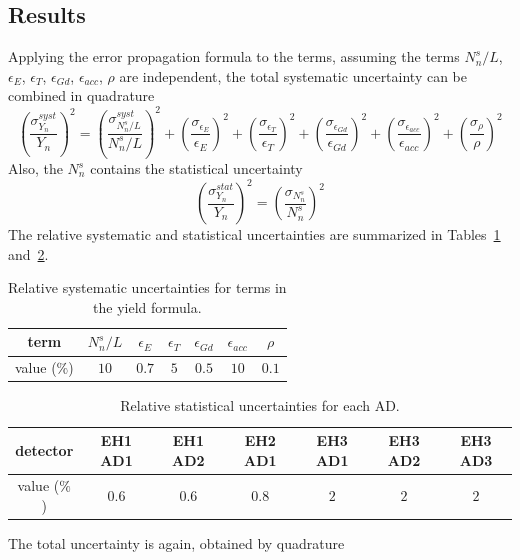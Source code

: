\subsection{Results}
Applying the error propagation formula to the terms, assuming the terms $N_n^s/L$, $\epsilon_E$, $\epsilon_{T}$, $\epsilon_{Gd}$, $\epsilon_{acc}$, $\rho$ are independent, the total systematic uncertainty can be combined in quadrature
\begin{equation}
	\left(\frac{\sigma^{syst}_{Y_n}}{Y_n}\right)^2=\left(\frac{\sigma_{N_n^s/L}^{syst}}{N_n^s/L}\right)^2+\left(\frac{\sigma_{\epsilon_E}}{\epsilon_E}\right)^2+\left(\frac{\sigma_{\epsilon_{T}}}{\epsilon_{T}}\right)^2+\left(\frac{\sigma_{\epsilon_{Gd}}}{\epsilon_{Gd}}\right)^2+\left(\frac{\sigma_{\epsilon_{acc}}}{\epsilon_{acc}}\right)^2+\left(\frac{\sigma_{\rho}}{\rho}\right)^2
\end{equation}
Also, the $N_n^s$ contains the statistical uncertainty
\begin{equation}
	\left(\frac{\sigma^{stat}_{Y_n}}{Y_n}\right)^2=\left(\frac{\sigma_{N_n^s}}{N_n^s}\right)^2
\end{equation}
The relative systematic and statistical uncertainties are summarized in Tables~\ref{tab:systematic_uncertainties} and~\ref{tab:statistical_uncertainties}.
\begin{table}[ht]
	\centering
	\begin{tabular}{|c|c|c|c|c|c|c|}
		\hline
		term & $N_n^s/L$ & $\epsilon_E$ & $\epsilon_{T}$ & $\epsilon_{Gd}$ & $\epsilon_{acc}$ & $\rho$ \\
		\hline
		value ($\%$) & $10$ & $0.7$ & $5$ & $0.5$ & $10$ & $0.1$ \\
		\hline
	\end{tabular}
	\caption{Relative systematic uncertainties for terms in the yield formula.}
	\label{tab:systematic_uncertainties}
\end{table}
\begin{table}[ht]
	\centering
	\begin{tabular}{|c|c|c|c|c|c|c|}
		\hline
		detector & EH1 AD1 & EH1 AD2 & EH2 AD1 & EH3 AD1 & EH3 AD2 & EH3 AD3 \\
		\hline
		value ($\%$) & $0.6$ & $0.6$ & $0.8$ & $2$ & $2$ & $2$ \\
		\hline
	\end{tabular}
	\caption{Relative statistical uncertainties for each AD.}
	\label{tab:statistical_uncertainties}
\end{table}
The total uncertainty is again, obtained by quadrature
